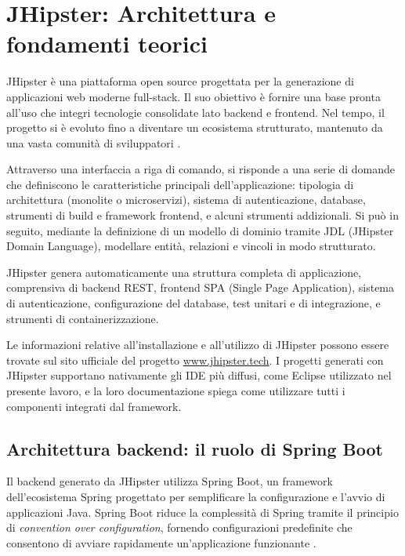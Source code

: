 
\chapter{JHipster: Architettura e fondamenti teorici}

JHipster è una piattaforma open source progettata per la generazione di applicazioni web moderne full-stack. Il suo obiettivo è fornire una base pronta all’uso che integri tecnologie consolidate lato backend e frontend. Nel tempo, il progetto si è evoluto fino a diventare un ecosistema strutturato, mantenuto da una vasta comunità di sviluppatori \cite{JHipsterDocs}.

Attraverso una interfaccia a riga di comando, si risponde a una serie di domande che definiscono le caratteristiche principali dell’applicazione: tipologia di architettura (monolite o microservizi), sistema di autenticazione, database, strumenti di build e framework frontend, e alcuni strumenti addizionali. Si può in seguito, mediante la definizione di un modello di dominio tramite JDL (JHipster Domain Language), modellare entità, relazioni e vincoli in modo strutturato.

JHipster genera automaticamente una struttura completa di applicazione, comprensiva di backend REST, frontend SPA (Single Page Application), sistema di autenticazione, configurazione del database, test unitari e di integrazione, e strumenti di containerizzazione.

Le informazioni relative all'installazione e all'utilizzo di JHipster possono essere trovate sul sito ufficiale del progetto \url{www.jhipster.tech}. I progetti generati con JHipster supportano nativamente gli IDE più diffusi, come Eclipse utilizzato nel presente lavoro, e la loro documentazione spiega come utilizzare tutti i componenti integrati dal framework.

\section{Architettura backend: il ruolo di Spring Boot}

Il backend generato da JHipster utilizza Spring Boot, un framework dell'ecosistema Spring progettato per semplificare la configurazione e l’avvio di applicazioni Java. Spring Boot riduce la complessità di Spring tramite il principio di \textit{convention over configuration}, fornendo configurazioni predefinite che consentono di avviare rapidamente un’applicazione funzionante \cite{SpringBootDocs}.

